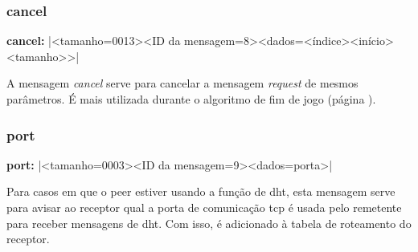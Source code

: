 
\newpage
\subsubsection*{cancel}

\textbf{cancel:} \bverb|<tamanho=0013><ID da mensagem=8><dados=<índice><início><tamanho>>|

A mensagem \emph{cancel} serve para cancelar a mensagem \emph{request} de mesmos
parâmetros. É mais utilizada durante o algoritmo de fim de jogo (página
\pageref{subsubsec:endgame}).


\subsubsection*{port}

\textbf{port:} \bverb|<tamanho=0003><ID da mensagem=9><dados=porta>|

Para casos em que o \gls*{peer} estiver usando a função de \gls*{dht}, esta mensagem
serve para avisar ao receptor qual a porta de comunicação \gls*{tcp} é usada pelo
remetente para receber mensagens de \gls*{dht}. Com isso, é adicionado à tabela de
roteamento do receptor.

